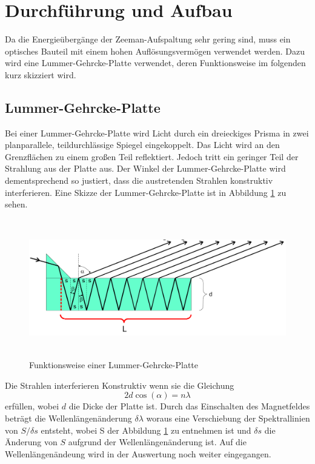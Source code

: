 \section{Durchführung und Aufbau}
\label{sec:Durchführung}
Da die Energieübergänge der Zeeman-Aufspaltung sehr gering sind, muss ein optisches Bauteil mit einem hohen Auflösungsvermögen verwendet werden. Dazu wird eine Lummer-Gehrcke-Platte verwendet, deren Funktionsweise im folgenden kurz skizziert wird.

\subsection{Lummer-Gehrcke-Platte}
Bei einer Lummer-Gehrcke-Platte wird Licht durch ein dreieckiges Prisma in zwei planparallele, teildurchlässige Spiegel eingekoppelt. Das Licht wird an den Grenzflächen zu einem großen Teil reflektiert. Jedoch tritt ein geringer Teil der Strahlung aus der Platte aus. Der Winkel der Lummer-Gehrcke-Platte wird dementsprechend so justiert, dass die austretenden Strahlen konstruktiv interferieren. Eine Skizze der Lummer-Gehrcke-Platte ist in Abbildung \ref{fig:Lum} zu sehen.

\begin{figure}[H]
  \centering
  \includegraphics[height=6cm]{Bilder/Lummer.png}
  \caption{Funktionsweise einer Lummer-Gehrcke-Platte \cite{V27}}
  \label{fig:Lum}
\end{figure}

Die Strahlen interferieren Konstruktiv wenn sie die Gleichung
\begin{equation}
  2 d \cos(\alpha) = n \lambda
\end{equation}
erfüllen, wobei $d$ die Dicke der Platte ist. Durch das Einschalten des Magnetfeldes beträgt die Wellenlängenänderung $\delta \lambda$ woraus eine Verschiebung der Spektrallinien von $S/\delta s$ entsteht, wobei S der Abbildung \ref{fig:Lum} zu entnehmen ist und $\delta s$ die Änderung von $S$ aufgrund der Wellenlängenänderung ist. Auf die Wellenlängenändeung wird in der Auswertung noch weiter eingegangen.

